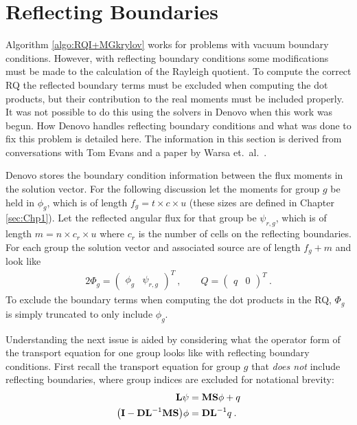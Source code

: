 
\chapter{Reflecting Boundaries}
\label{sec:AppendixC}

Algorithm \ref{algo:RQI+MGkrylov} works for problems with vacuum boundary conditions. However, with reflecting boundary conditions some modifications must be made to the calculation of the Rayleigh quotient. To compute the correct RQ the reflected boundary terms must be excluded when computing the dot products, but their contribution to the real moments must be included properly. It was not possible to do this using the solvers in Denovo when this work was begun. How Denovo handles reflecting boundary conditions and what was done to fix this problem is detailed here. The information in this section is derived from conversations with Tom Evans \cite{} and a paper by Warsa et.\ al.\ \cite{Warsa2004}.

Denovo stores the boundary condition information between the flux moments in the solution vector. For the following discussion let the moments for group $g$ be held in $\phi_{g}$, which is of length $f_{g} = t \times c \times u$ (these sizes are defined in Chapter \ref{sec:Chp1}). Let the reflected angular flux for that group be $\psi_{r,g}$, which is of length $m = n \times c_{r} \times u$ where $c_{r}$ is the number of cells on the reflecting boundaries. For each group the solution vector and associated source are of length $f_{g} + m$ and look like
%
\begin{alignat}{2}
 \Phi_{g} = \begin{pmatrix} \phi_{g} & \psi_{r,g} \end{pmatrix}^{T} \:, \qquad Q = \begin{pmatrix} q & 0 \end{pmatrix}^{T} \:.
\label{eq:reflFlux}
\end{alignat}
%
To exclude the boundary terms when computing the dot products in the RQ, $\Phi_{g}$ is simply truncated to only include $\phi_{g}$. 

Understanding the next issue is aided by considering what the operator form of the transport equation for one group looks like with reflecting boundary conditions. First recall the transport equation for group $g$ that \emph{does not} include reflecting boundaries, where group indices are excluded for notational brevity:
%
\begin{align}
  \mathbf{L} \psi &= \mathbf{MS}\phi + q
  \label{eq:transport} \\
  \bigl(\mathbf{I} - \mathbf{DL}^{-1}\mathbf{MS} \bigr) \phi &= \mathbf{DL}^{-1}q \:.
  \label{eq:transportMoments}
\end{align}


